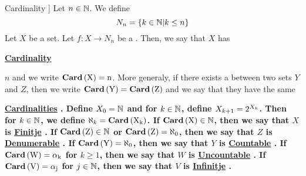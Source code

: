 \label{def:Cardinality}
\newcommand{\Cardinal}[0]{
    \bf \hyperref[def:Cardinality]{Cardinal} \rm
}
\newcommand{\Cardinals}[0]{
    \bf \hyperref[def:Cardinality]{Cardinals} \rm
}
\newcommand{\Cardinality}[0]{
    \bf \hyperref[def:Cardinality]{Cardinality} \rm
}
\newcommand{\Cardinalities}[0]{
    \bf \hyperref[def:Cardinality]{Cardinalities} \rm
}
\newcommand{\FirstNaturals}[1]{
    N_{#1}
}
\newcommand{\CardinalityFunction}[1]{
    \bf
    Card
    \rm
    \pa{#1}
}
\newcommand{\Finite}[0]{
    \bf \hyperref[def:Cardinality]{Finitje} \rm
}
\newcommand{\Infinite}[0]{
    \bf \hyperref[def:Cardinality]{Infinitje} \rm
}
\newcommand{\Denumerable}[0]{
    \bf \hyperref[def:Cardinality]{Denumerable} \rm
}
\newcommand{\Countable}[0]{
    \bf \hyperref[def:Cardinality]{Countable} \rm
}
\newcommand{\Uncountable}[0]{
    \bf \hyperref[def:Cardinality]{Uncountable} \rm
}
\begin{df}[\Cardinality]
    Let $n \in \mathbb{N}$. We define 
    \begin{equation*}
        \FirstNaturals{n}=\{ k \in \N | k \leq n\}
    \end{equation*}
    Let $X$ be a set.
    Let $f:X \to \FirstNaturals{n}$ 
    be a 
    \Bijection. 
    Then, we say that 
    $X$ has 
    \Cardinality
    $n$
    and we write 
    $\CardinalityFunction{X}=n$.
    More generaly, if there exists a 
    \Bijection
    between two sets 
    $Y$ and $Z$, then we write
    $\CardinalityFunction{Y}=\CardinalityFunction{Z}$
    and we say that they have the same 
    \Cardinalities. 
    Define
    $X_0=\mathbb{N}$
    and for $k \in \mathbb{N}$, define 
    $X_{k+1} = 2^{X_k}$. 
    Then for $k \in \mathbb{N}$, we define 
    $\aleph_k = \CardinalityFunction{X_k}$.
    If $\CardinalityFunction{X} \in \N$, then 
    we say that $X$ is \Finite. 
    If $\CardinalityFunction{Z} \in \N$ or 
    $\CardinalityFunction{Z} = \aleph_0$, 
    then we say that $Z$ is \Denumerable.
    If $\CardinalityFunction{Y} = \aleph_0$, then
    we say that $Y$ is \Countable.
    If $\CardinalityFunction{W}= \alpha_k$ for $k \geq 1$, 
    then we say that $W$ is \Uncountable. 
    If $\CardinalityFunction{V} = \alpha_j$ for $j \in \mathbb{N}$, 
    then we say that $V$ is \Infinite. 


\end{df}



